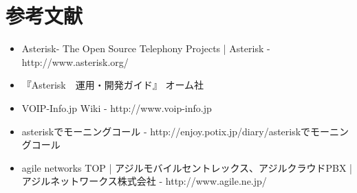 \section{参考文献}
\begin{itemize}
\item Asterisk- The Open Source Telephony Projects | Asterisk - http://www.asterisk.org/
\item 『Asterisk　運用・開発ガイド』 オーム社
\item VOIP-Info.jp Wiki - http://www.voip-info.jp
\item asteriskでモーニングコール - http://enjoy.potix.jp/diary/asteriskでモーニングコール
\item agile networks TOP | アジルモバイルセントレックス、アジルクラウドPBX | アジルネットワークス株式会社 - http://www.agile.ne.jp/
\end{itemize}
